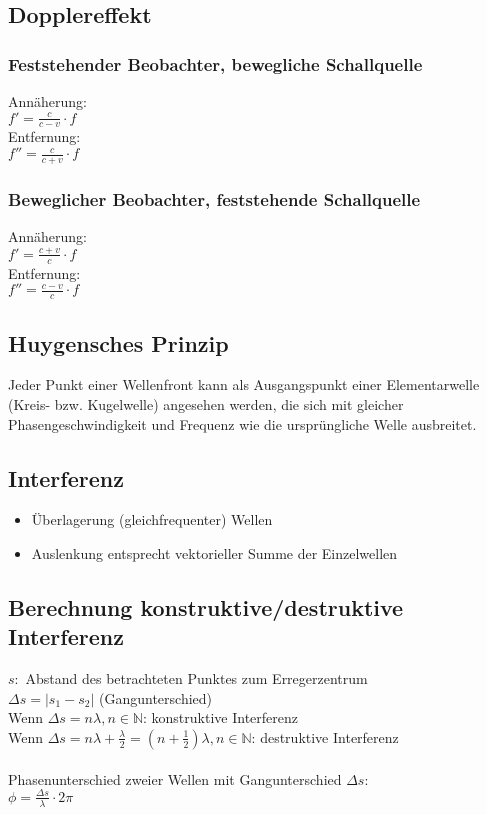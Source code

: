\documentclass[12pt,a4paper,titlepage]{article}
\begin{document}
		\subsection{Dopplereffekt}
			\subsubsection{Feststehender Beobachter, bewegliche Schallquelle}
				Annäherung: \\
				$f' = \frac{c}{c-v}\cdot f$\\
				Entfernung: \\
				$f'' = \frac{c}{c+v}\cdot f$
			\subsubsection{Beweglicher Beobachter, feststehende Schallquelle}
				Annäherung: \\
				$f' = \frac{c+v}{c}\cdot f$\\
				Entfernung: \\
				$f'' = \frac{c-v}{c}\cdot f$
		\subsection{Huygensches Prinzip}
			Jeder Punkt einer Wellenfront kann als Ausgangspunkt einer Elementarwelle (Kreis- bzw. Kugelwelle) angesehen werden, die sich mit gleicher Phasengeschwindigkeit und Frequenz wie die ursprüngliche Welle ausbreitet.
		\subsection{Interferenz}
			\begin{itemize}
				\item Überlagerung (gleichfrequenter) Wellen
				\item Auslenkung entsprecht vektorieller Summe der Einzelwellen
			\end{itemize}
			\subsection{Berechnung konstruktive/destruktive Interferenz}
			$s:$ Abstand des betrachteten Punktes zum Erregerzentrum \\
			$\Delta s = |s_1 - s_2|$ (Gangunterschied)\\
			Wenn $\Delta s = n \lambda, n \in \mathbb{N}$: konstruktive Interferenz\\
			Wenn $\Delta s = n \lambda + \frac{\lambda}{2} = (n+\frac{1}{2}) \lambda, n \in \mathbb{N}$: destruktive Interferenz\\\\
			Phasenunterschied zweier Wellen mit Gangunterschied $\Delta s$:\\
			$\phi = \frac{\Delta s}{\lambda} \cdot 2 \pi$
\end{document}
